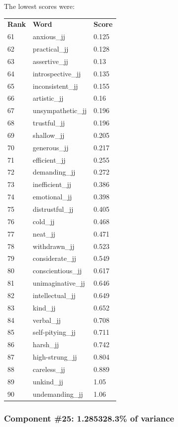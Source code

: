 \documentclass[10pt,letterpaper]{book}
\begin{document}
The lowest scores were:
\begin{tabular}{ l l l }
        \textbf{Rank} & \textbf{Word} & \textbf{Score} \\
        61 & anxious\_jj & 0.125 \\
        62 & practical\_jj & 0.128 \\
        63 & assertive\_jj & 0.13 \\
        64 & introspective\_jj & 0.135 \\
        65 & inconsistent\_jj & 0.155 \\
        66 & artistic\_jj & 0.16 \\
        67 & unsympathetic\_jj & 0.196 \\
        68 & trustful\_jj & 0.196 \\
        69 & shallow\_jj & 0.205 \\
        70 & generous\_jj & 0.217 \\
        71 & efficient\_jj & 0.255 \\
        72 & demanding\_jj & 0.272 \\
        73 & inefficient\_jj & 0.386 \\
        74 & emotional\_jj & 0.398 \\
        75 & distrustful\_jj & 0.405 \\
        76 & cold\_jj & 0.468 \\
        77 & neat\_jj & 0.471 \\
        78 & withdrawn\_jj & 0.523 \\
        79 & considerate\_jj & 0.549 \\
        80 & conscientious\_jj & 0.617 \\
        81 & unimaginative\_jj & 0.646 \\
        82 & intellectual\_jj & 0.649 \\
        83 & kind\_jj & 0.652 \\
        84 & verbal\_jj & 0.708 \\
        85 & self-pitying\_jj & 0.711 \\
        86 & harsh\_jj & 0.742 \\
        87 & high-strung\_jj & 0.804 \\
        88 & careless\_jj & 0.889 \\
        89 & unkind\_jj & 1.05 \\
        90 & undemanding\_jj & 1.06 \\
\end{tabular}
\subsubsection{Component \#25: 1.285328.3\% of variance}
\end{document}

